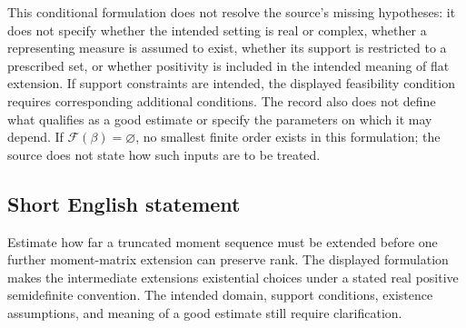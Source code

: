 \documentclass[11pt]{article}
\begin{document}
This conditional formulation does not resolve the source's missing hypotheses: it does not specify whether the intended setting is real or complex, whether a representing measure is assumed to exist, whether its support is restricted to a prescribed set, or whether positivity is included in the intended meaning of flat extension. If support constraints are intended, the displayed feasibility condition requires corresponding additional conditions. The record also does not define what qualifies as a good estimate or specify the parameters on which it may depend. If \(\mathcal F(\beta)=\varnothing\), no smallest finite order exists in this formulation; the source does not state how such inputs are to be treated.
\subsection{Short English statement}
Estimate how far a truncated moment sequence must be extended before one further moment-matrix extension can preserve rank. The displayed formulation makes the intermediate extensions existential choices under a stated real positive semidefinite convention. The intended domain, support conditions, existence assumptions, and meaning of a good estimate still require clarification.
\end{document}
